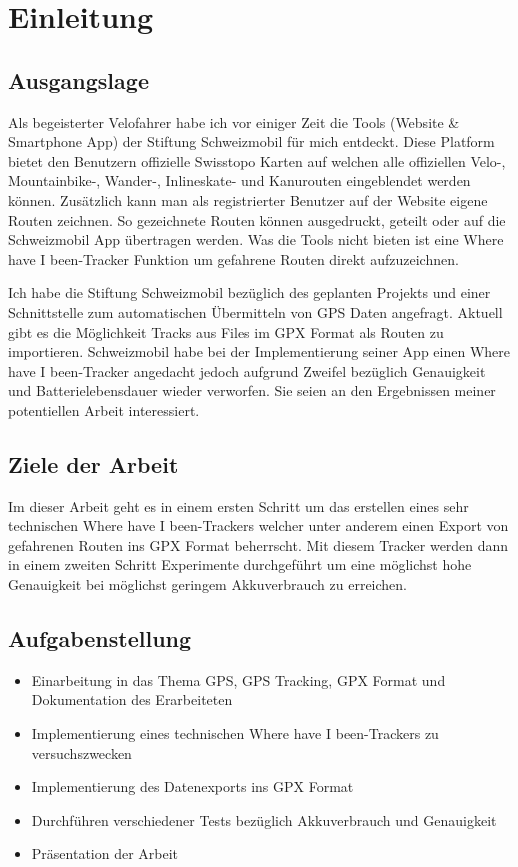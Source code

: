 \section{Einleitung}
\subsection{Ausgangslage}
Als begeisterter Velofahrer habe ich vor einiger Zeit die Tools (Website \& Smartphone App) der Stiftung Schweizmobil\cite{schweizmobil} für mich entdeckt. Diese Platform bietet den Benutzern offizielle Swisstopo Karten auf welchen alle offiziellen Velo-, Mountainbike-, Wander-, Inlineskate- und Kanurouten eingeblendet werden können. Zusätzlich kann man als registrierter Benutzer auf der Website eigene Routen zeichnen. So gezeichnete Routen können ausgedruckt, geteilt oder auf die Schweizmobil App übertragen werden. Was die Tools nicht bieten ist eine \flqq Where have I been\frqq-Tracker Funktion um gefahrene Routen direkt aufzuzeichnen.

Ich habe die Stiftung Schweizmobil bezüglich des geplanten Projekts und einer Schnittstelle zum automatischen Übermitteln von GPS Daten angefragt. Aktuell gibt es die Möglichkeit Tracks aus Files im GPX Format als Routen zu importieren. Schweizmobil habe bei der Implementierung seiner App einen \flqq Where have I been\frqq-Tracker angedacht jedoch aufgrund Zweifel bezüglich Genauigkeit und Batterielebensdauer wieder verworfen. Sie seien an den Ergebnissen meiner potentiellen Arbeit interessiert.

\subsection{Ziele der Arbeit}
Im dieser Arbeit geht es in einem ersten Schritt um das erstellen eines sehr technischen \flqq Where have I been\frqq-Trackers welcher unter anderem einen Export von gefahrenen Routen ins GPX Format beherrscht. Mit diesem Tracker werden dann in einem zweiten Schritt Experimente durchgeführt um eine möglichst hohe Genauigkeit bei möglichst geringem Akkuverbrauch zu erreichen.

\subsection{Aufgabenstellung}
\begin{itemize}
\item Einarbeitung in das Thema GPS, GPS Tracking, GPX Format und Dokumentation des Erarbeiteten
\item Implementierung eines technischen \flqq Where have I been\frqq-Trackers zu versuchszwecken
\item Implementierung des Datenexports ins GPX Format
\item Durchführen verschiedener Tests bezüglich Akkuverbrauch und Genauigkeit
\item Präsentation der Arbeit
\end{itemize}

